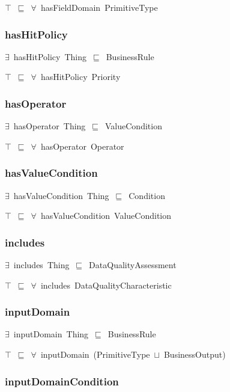 \documentclass{article}
\begin{document}
\ensuremath{\top}~\ensuremath{\sqsubseteq}~\ensuremath{\forall}~hasFieldDomain~PrimitiveType

\subsubsection*{hasHitPolicy}

\ensuremath{\exists}~hasHitPolicy~Thing~\ensuremath{\sqsubseteq}~BusinessRule

\ensuremath{\top}~\ensuremath{\sqsubseteq}~\ensuremath{\forall}~hasHitPolicy~Priority

\subsubsection*{hasOperator}

\ensuremath{\exists}~hasOperator~Thing~\ensuremath{\sqsubseteq}~ValueCondition

\ensuremath{\top}~\ensuremath{\sqsubseteq}~\ensuremath{\forall}~hasOperator~Operator

\subsubsection*{hasValueCondition}

\ensuremath{\exists}~hasValueCondition~Thing~\ensuremath{\sqsubseteq}~Condition

\ensuremath{\top}~\ensuremath{\sqsubseteq}~\ensuremath{\forall}~hasValueCondition~ValueCondition

\subsubsection*{includes}

\ensuremath{\exists}~includes~Thing~\ensuremath{\sqsubseteq}~DataQualityAssessment

\ensuremath{\top}~\ensuremath{\sqsubseteq}~\ensuremath{\forall}~includes~DataQualityCharacteristic

\subsubsection*{inputDomain}

\ensuremath{\exists}~inputDomain~Thing~\ensuremath{\sqsubseteq}~BusinessRule

\ensuremath{\top}~\ensuremath{\sqsubseteq}~\ensuremath{\forall}~inputDomain~(PrimitiveType~\ensuremath{\sqcup}~BusinessOutput)

\subsubsection*{inputDomainCondition}
\end{document}
